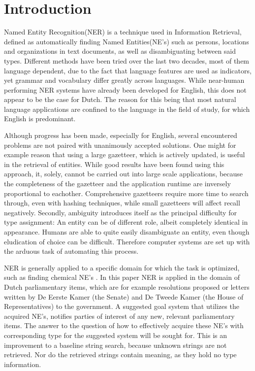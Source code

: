 \section{Introduction} \label{sec:introduction}
Named Entity Recognition(NER) is a technique used in Information Retrieval, defined as automatically finding Named Entities(NE's) such as persons, locations and organizations in text documents, as well as disambiguating between said types. Different methods have been tried over the last two decades, most of them language dependent, due to the fact that language features are used as indicators, yet grammar and vocabulary differ greatly across languages. While near-human performing NER systems have already been developed for English, this does not appear to be the case for Dutch. The reason for this being that most natural language applications are confined to the language in the field of study, for which English is predominant.  

Although progress has been made, especially for English, several encountered problems are not paired with unanimously accepted solutions. 
One might for example reason that using a large gazetteer, which is actively updated, is useful in the retrieval of entities. While good results have been found using this approach, it, solely, cannot be carried out into large scale applications, because the completeness of the gazetteer and the application runtime are inversely proportional to eachother. Comprehensive gazetteers require more time to search through, even with hashing techniques, while small gazetteers will affect recall negatively. 
Secondly, ambiguity introduces itself as the principal difficulty for type assignment: An entity can be of different role, albeit completely identical in appearance. Humans are able to quite easily disambiguate an entity, even though eludication of choice can be difficult. Therefore computer systems are set up with the arduous task of automating this process.

NER is generally applied to a specific domain for which the task is optimized, such as finding chemical NE's \cite{rocktaschel2012chemspot}. 
In this paper NER is applied in the domain of Dutch parliamentary items, which are for example resolutions proposed or letters written by De Eerste Kamer (the Senate) and De Tweede Kamer (the House of Representatives) to the government. A suggested goal system that utilizes the acquired NE's, notifies parties of interest of any new, relevant parliamentary items.
The answer to the question of how to effectively acquire these NE's with corresponding type for the suggested system will be sought for.
This is an improvement to a baseline string search, because unknown strings are not retrieved. Nor do the retrieved strings contain meaning, as they hold no type information.

